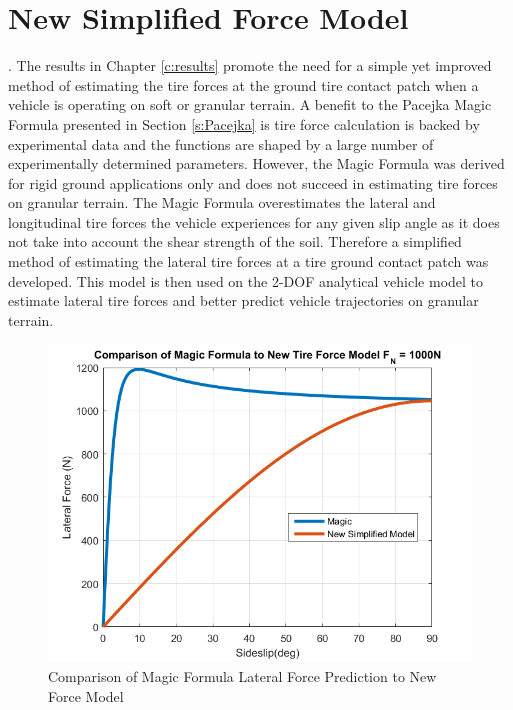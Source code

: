 \documentclass[12pt,onecolumn]{report}
\begin{document}
\section{New Simplified Force Model}\label{s:NewForce}. 
The results in Chapter \ref{c:results} promote the need for a simple yet improved method of estimating the tire forces at the ground tire contact patch when a vehicle is operating on soft or granular terrain. A benefit to the Pacejka Magic Formula presented in Section \ref{s:Pacejka} is tire force calculation is backed by experimental data and the functions are shaped by a large number of experimentally determined parameters. However, the Magic Formula was derived for rigid ground applications only and does not succeed in estimating tire forces on granular terrain. The Magic Formula overestimates the lateral and longitudinal tire forces the vehicle experiences for any given slip angle as it does not take into account the shear strength of the soil. Therefore a simplified method of estimating the lateral tire forces at a tire ground contact patch was developed. This model is then used on the 2-DOF analytical vehicle model to estimate lateral tire forces and better predict vehicle trajectories on granular terrain.

\begin{figure}
	\centering
	\includegraphics[width=0.8\columnwidth]{Figs/forceComparison.png}
	\caption{\small Comparison of Magic Formula Lateral Force Prediction to New Force Model}  
	\label{fig:newForceComparison}
\end{figure}
\end{document}
